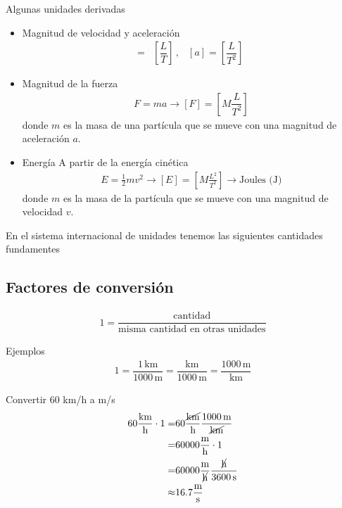 \documentclass[11pt,a4paper]{article}
\begin{document}
\newpage
Algunas unidades derivadas
\begin{itemize}
\item Magnitud de velocidad y aceleración
\begin{align*}
    [v] =& \left[\dfrac{L}{T}\right]\,, & [a] = \left[\dfrac{L}{T^2}\right]\,
\end{align*}
    \item Magnitud de la fuerza
    \begin{align*}
        F = m a \to [F] =\left[M \dfrac{L}{T^2}\right]
    \end{align*}
    donde $m$ es la masa de una partícula que se mueve con una magnitud de aceleración $a$.
    \item Energía
    A partir de la energía cinética
    \begin{align*}
        E = \frac{1}{2}m v^2 \to [E] = \left[M\frac{L^2}{T^2}\right] \to \text{Joules (J)}
    \end{align*}
    donde $m$ es la masa de la partícula que se mueve con una magnitud de velocidad $v$.
\end{itemize}


En el sistema internacional de unidades tenemos las siguientes cantidades fundamentes

\subsection{Factores de conversión}

\begin{align*}
    1 = \dfrac{\text{cantidad}}{\text{misma cantidad en otras unidades}}
\end{align*}

Ejemplos
\begin{align*}
    1=\dfrac{1\,\text{km}}{1000\,\text{m}} = \dfrac{\text{km}}{1000\,\text{m}} =\dfrac{1000\,\text{m}}{\text{km}}
\end{align*}

Convertir 60 km/h a m/s
\begin{align*}
    60\dfrac{\text{km}}{\text{h}}\cdot 1 =& 60\dfrac{\cancel{\text{km}}}{\text{h}}  \dfrac{1000\,\text{m}}{\cancel{\text{km}}}\\
    =& 60000\dfrac{\text{m}}{\text{h}}\cdot 1\\
    =&60000\dfrac{\text{m}}{\cancel{\text{h}}}
    \dfrac{{\cancel{\text{h}}}}{3600\,\text{s}}\\
    \approx& 16.7 \frac{\text{m}}{\text{s}}
\end{align*}
\end{document}
